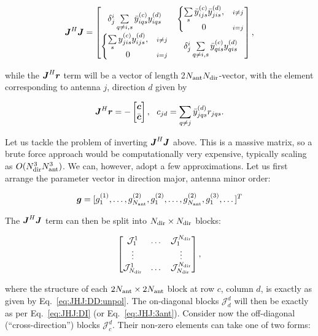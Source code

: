 \documentclass[useAMS,usenatbib]{mn2e}
\newcommand{\mat}[1]{{\bmath{#1}}}
\newcommand{\JJ}{\mat{J}} %
\newcommand{\JHJ}{\JJ^H\JJ} %
\begin{document}
\begin{equation}
\JHJ = \Matrix{cc}{
  \delta^i_j \sum\limits_{q\ne i,s} \yycH_{iqs} \yyd_{iqs}  & 
  \left \{ 
  \begin{array}{@{}cc@{}}
   \sum\limits_{s} \yycH_{ijs} \yydH_{jis}, & {\scriptstyle i\ne j}\\
   0 &{\scriptstyle i=j}
  \end{array} \right . 
  \\
  \left \{ 
  \begin{array}{@{}cc@{}}
   \sum\limits_{s} \yyc_{jis} \yyd_{ijs},&{\scriptstyle i\ne j} \\
   0 &{\scriptstyle i=j}
  \end{array} \right . 
  &
  \delta^i_j \sum\limits_{q\ne i,s} \yycH_{qis}\yyd_{qis}
},
\label{eq:JHJ:DD:unpol}
\end{equation}

while the $\JJ^H\bmath{r}$ term will be a vector of length 2$N_\mathrm{ant}N_\mathrm{dir}$-vector, with the element corresponding to 
antenna $j$, direction $d$ given by 

\[
\JJ^H\bmath{r} = -\Matrix{c}{\bmath{c}\\\bar{\bmath{c}}},~~c_{jd} = \sum\limits_{q\ne j} \yydH_{jqs} r_{jqs}.
\]

Let us tackle the problem of inverting $\JHJ$ above. This is a massive matrix, so a brute force 
approach would be computationally very expensive, typically scaling as $O(N_\mathrm{dir}^3N_\mathrm{ant}^3)$. We can, 
however, adopt a few approximations. Let us first arrange the parameter vector in direction 
major, antenna minor order:

\[
\bmath{g} = [g^{(1)}_1,\dots,g^{(2)}_{N_\mathrm{ant}},g^{(2)}_1,\dots,g^{(2)}_{N_\mathrm{ant}},g^{(3)}_1,\dots ]^T
\]

The $\JHJ$ term can then be split into $N_\mathrm{dir}\times N_\mathrm{dir}$ blocks:

\newcommand{\JJJ}{\mathcal{J}}
\begin{equation}
\label{eq:JHJ:DD:blocked}
\Matrix{ccc}{\JJJ^1_1 & \dots & \JJJ^{\Nd}_1 \\
\vdots & & \vdots \\
\JJJ_{\Nd}^1 & \dots & \JJJ_{\Nd}^{\Nd} },
\end{equation}

where the structure of each $2N_\mathrm{ant}\times2N_\mathrm{ant}$ block at row $c$, column $d$, is exactly as 
given by Eq.~\ref{eq:JHJ:DD:unpol}. The on-diagonal blocks $\JJJ^d_d$ will then be exactly as per 
Eq.~\ref{eq:JHJ:DI} (or Eq.~\ref{eq:JHJ:3ant}). Consider now the off-diagonal (``cross-direction'') 
blocks $\JJJ^d_c$. Their non-zero elements can take one of two forms:
\end{document}

